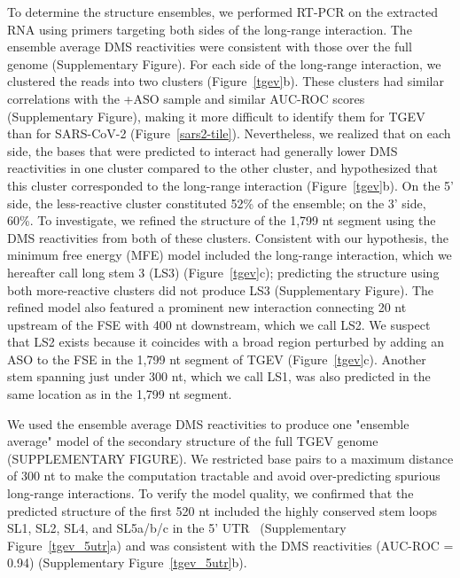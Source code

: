 \documentclass[main.tex]{subfiles}
\begin{document}
To determine the structure ensembles, we performed RT-PCR on the extracted RNA using primers targeting both sides of the long-range interaction.
The ensemble average DMS reactivities were consistent with those over the full genome (Supplementary Figure).
For each side of the long-range interaction, we clustered the reads into two clusters (Figure~\ref{tgev}b).
These clusters had similar correlations with the +ASO sample and similar AUC-ROC scores (Supplementary Figure), making it more difficult to identify them for TGEV than for SARS-CoV-2 (Figure~\ref{sars2-tile}).
Nevertheless, we realized that on each side, the bases that were predicted to interact had generally lower DMS reactivities in one cluster compared to the other cluster, and hypothesized that this cluster corresponded to the long-range interaction (Figure~\ref{tgev}b).
On the 5' side, the less-reactive cluster constituted 52\% of the ensemble; on the 3' side, 60\%.
To investigate, we refined the structure of the 1,799 nt segment using the DMS reactivities from both of these clusters.
Consistent with our hypothesis, the minimum free energy (MFE) model included the long-range interaction, which we hereafter call long stem 3 (LS3) (Figure~\ref{tgev}c); predicting the structure using both more-reactive clusters did not produce LS3 (Supplementary Figure).
The refined model also featured a prominent new interaction connecting 20 nt upstream of the FSE with 400 nt downstream, which we call LS2.
We suspect that LS2 exists because it coincides with a broad region perturbed by adding an ASO to the FSE in the 1,799 nt segment of TGEV (Figure~\ref{tgev}c).
Another stem spanning just under 300 nt, which we call LS1, was also predicted in the same location as in the 1,799 nt segment.

We used the ensemble average DMS reactivities to produce one "ensemble average" model of the secondary structure of the full TGEV genome (SUPPLEMENTARY FIGURE).
We restricted base pairs to a maximum distance of 300 nt to make the computation tractable and avoid over-predicting spurious long-range interactions.
To verify the model quality, we confirmed that the predicted structure of the first 520 nt included the highly conserved stem loops SL1, SL2, SL4, and SL5a/b/c in the 5' UTR~\cite{Yang2015a} (Supplementary Figure~\ref{tgev_5utr}a) and was consistent with the DMS reactivities (AUC-ROC = 0.94) (Supplementary Figure~\ref{tgev_5utr}b).
\end{document}
